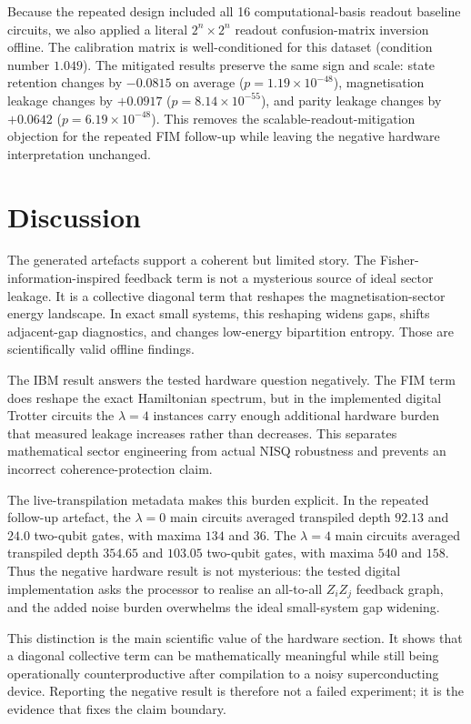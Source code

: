 \documentclass[preprint,aps,physrev,superscriptaddress,floatfix,longbibliography]{revtex4-2}
\begin{document}
Because the repeated design included all 16 computational-basis readout
baseline circuits, we also applied a literal $2^n\times 2^n$ readout
confusion-matrix inversion offline. The calibration matrix is well-conditioned
for this dataset (condition number $1.049$). The mitigated results preserve the
same sign and scale: state retention changes by $-0.0815$ on average
($p=1.19\times10^{-48}$), magnetisation leakage changes by $+0.0917$
($p=8.14\times10^{-55}$), and parity leakage changes by $+0.0642$
($p=6.19\times10^{-48}$). This removes the scalable-readout-mitigation
objection for the repeated FIM follow-up while leaving the negative hardware
interpretation unchanged.

\section{Discussion}

The generated artefacts support a coherent but limited story. The
Fisher-information-inspired feedback term is not a mysterious source of ideal
sector leakage. It is a collective diagonal term that reshapes the
magnetisation-sector energy landscape. In exact small systems, this reshaping
widens gaps, shifts adjacent-gap diagnostics, and changes low-energy
bipartition entropy. Those are scientifically valid offline findings.

The IBM result answers the tested hardware question negatively. The FIM term
does reshape the exact Hamiltonian spectrum, but in the implemented digital
Trotter circuits the $\lambda=4$ instances carry enough additional hardware
burden that measured leakage increases rather than decreases. This separates
mathematical sector engineering from actual NISQ robustness and prevents an
incorrect coherence-protection claim.

The live-transpilation metadata makes this burden explicit. In the repeated
follow-up artefact, the $\lambda=0$ main circuits averaged transpiled depth
$92.13$ and $24.0$ two-qubit gates, with maxima $134$ and $36$. The
$\lambda=4$ main circuits averaged transpiled depth $354.65$ and
$103.05$ two-qubit gates, with maxima $540$ and $158$. Thus the negative
hardware result is not mysterious: the tested digital implementation asks the
processor to realise an all-to-all $Z_iZ_j$ feedback graph, and the added
noise burden overwhelms the ideal small-system gap widening.

This distinction is the main scientific value of the hardware section. It shows
that a diagonal collective term can be mathematically meaningful while still
being operationally counterproductive after compilation to a noisy
superconducting device. Reporting the negative result is therefore not a failed
experiment; it is the evidence that fixes the claim boundary.
\end{document}
